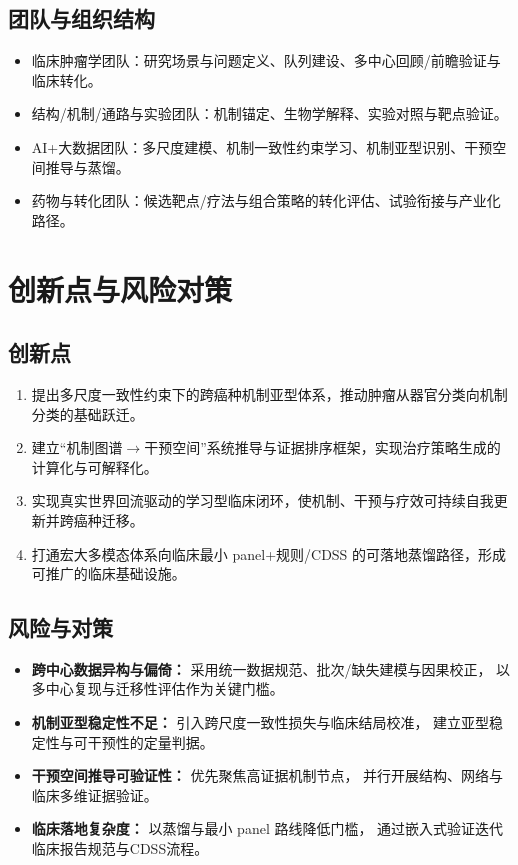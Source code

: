 \documentclass[12pt,a4paper,fontset=mac]{ctexart}
\begin{document}
\subsection{团队与组织结构}
\begin{itemize}[leftmargin=2em]
  \item 临床肿瘤学团队：研究场景与问题定义、队列建设、多中心回顾/前瞻验证与临床转化。
  \item 结构/机制/通路与实验团队：机制锚定、生物学解释、实验对照与靶点验证。
  \item AI+大数据团队：多尺度建模、机制一致性约束学习、机制亚型识别、干预空间推导与蒸馏。
  \item 药物与转化团队：候选靶点/疗法与组合策略的转化评估、试验衔接与产业化路径。
\end{itemize}

\section{创新点与风险对策}

\subsection{创新点}
\begin{enumerate}[leftmargin=2em]
  \item 提出多尺度一致性约束下的跨癌种机制亚型体系，推动肿瘤从器官分类向机制分类的基础跃迁。
  \item 建立“机制图谱$\rightarrow$干预空间”系统推导与证据排序框架，实现治疗策略生成的计算化与可解释化。
  \item 实现真实世界回流驱动的学习型临床闭环，使机制、干预与疗效可持续自我更新并跨癌种迁移。
  \item 打通宏大多模态体系向临床最小 panel+规则/CDSS 的可落地蒸馏路径，形成可推广的临床基础设施。
\end{enumerate}

\subsection{风险与对策}
\begin{itemize}[leftmargin=2em]
  \item \textbf{跨中心数据异构与偏倚：}
        采用统一数据规范、批次/缺失建模与因果校正，
        以多中心复现与迁移性评估作为关键门槛。
  \item \textbf{机制亚型稳定性不足：}
        引入跨尺度一致性损失与临床结局校准，
        建立亚型稳定性与可干预性的定量判据。
  \item \textbf{干预空间推导可验证性：}
        优先聚焦高证据机制节点，
        并行开展结构、网络与临床多维证据验证。
  \item \textbf{临床落地复杂度：}
        以蒸馏与最小 panel 路线降低门槛，
        通过嵌入式验证迭代临床报告规范与CDSS流程。
\end{itemize}

% 
% 
\end{document}
